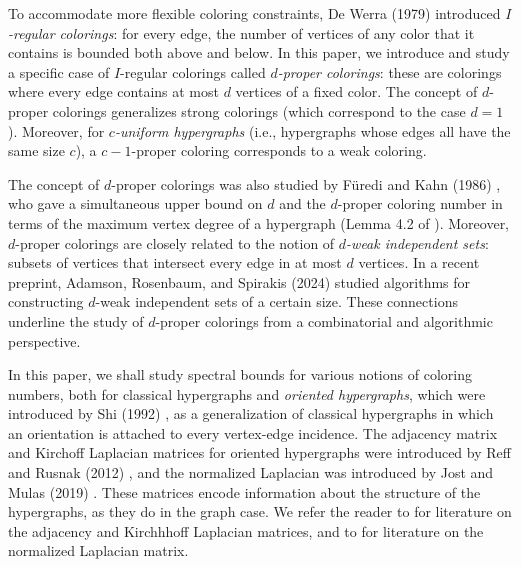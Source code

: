 \documentclass{article}
\theoremstyle{plain}
\theoremstyle{definition}
\theoremstyle{remark}
\begin{document}
To accommodate more flexible coloring constraints, De Werra (1979) \cite{DeWerra1979} introduced \emph{$I$-regular colorings}: for every edge, the number of vertices of any color that it contains is bounded both above and below.
In this paper, we introduce and study a specific case of $I$-regular colorings called \emph{$d$-proper colorings}: these are colorings where every edge contains at most $d$ vertices of a fixed color. The concept of $d$-proper colorings generalizes strong colorings (which correspond to the case $d=1$). Moreover, for \emph{$c$-uniform hypergraphs} (i.e., hypergraphs whose edges all have the same size $c$), a $c-1$-proper coloring corresponds to a weak coloring.


The concept of $d$-proper colorings was also studied by
F\"uredi and Kahn (1986) \cite{FurediKahn1986}, who gave a simultaneous upper bound on $d$ and the $d$-proper coloring number in terms of the maximum vertex degree of a hypergraph (Lemma 4.2 of \cite{FurediKahn1986}).
Moreover, $d$-proper colorings are closely related to the notion of \emph{$d$-weak independent sets}: subsets of vertices that intersect every edge in at most $d$ vertices.
In a recent preprint, Adamson, Rosenbaum, and Spirakis (2024) \cite{adamson2024distributed} studied algorithms for constructing $d$-weak independent sets of a certain size.
These connections underline the study of $d$-proper colorings from a combinatorial and algorithmic perspective.

In this paper, we shall study spectral bounds for various notions of coloring numbers, both for classical hypergraphs and \emph{oriented hypergraphs}, which were introduced by 
Shi (1992) \cite{shi1992signed}, as a generalization of classical hypergraphs in which an orientation is attached to every vertex-edge incidence.
The adjacency matrix and Kirchoff Laplacian matrices for oriented hypergraphs were introduced by Reff and Rusnak (2012) \cite{ReffRusnak2012}, and the normalized Laplacian was introduced by Jost and Mulas (2019) \cite{JostMulas2019}.
These matrices encode information about the structure of the hypergraphs, as they do in the graph case.
We refer the reader to
\cite{ChenLiuRobinsonRusnakWang2018, ChenRaoRusnakYang2015, DuttweilerReff2019, RusnakReynesJohnsonYe2021, GrillietteReynesRusnak2022, RusnakReynesLiYanYu2024, KitouniReff2019, Reff2014, Reff2016, ReffRusnak2012, RusnakRobinsonSchmidtShroff2019, Rusnak2013}
for literature on the adjacency and Kirchhhoff Laplacian matrices, and to
\cite{AndreottiMulas2022, JostMulas2019, Mulas2021, MulasZhang2021, mulas2022hypergraphs}
for literature on the normalized Laplacian matrix.
\end{document}
